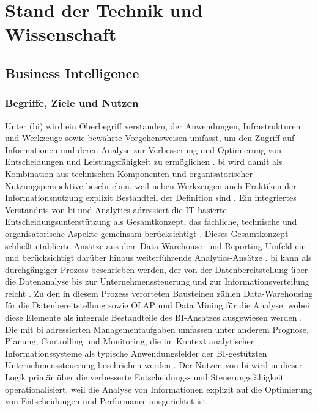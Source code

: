 
\chapter{Stand der Technik und Wissenschaft}\label{cap:wissensstand}


\section{Business Intelligence}\label{sec:bi} 

\subsection{Begriffe, Ziele und Nutzen}
Unter  (\gls{bi}) wird ein Oberbegriff verstanden, der Anwendungen, Infrastrukturen und Werkzeuge sowie bewährte Vorgehensweisen umfasst, um den Zugriff auf Informationen und deren Analyse zur Verbesserung und Optimierung von Entscheidungen und Leistungsfähigkeit zu ermöglichen \cite{GartnerABI}. \gls{bi} wird damit als Kombination aus technischen Komponenten und organisatorischer Nutzungsperspektive beschrieben, weil neben Werkzeugen auch Praktiken der Informationsnutzung explizit Bestandteil der Definition sind \cite{GartnerABI}. 
Ein integriertes Verständnis von \gls{bi} und Analytics adressiert die IT-basierte Entscheidungsunterstützung als Gesamtkonzept, das fachliche, technische und organisatorische Aspekte gemeinsam berücksichtigt \cite{BaarsKemperSpringerBook}. Dieses Gesamtkonzept schließt etablierte Ansätze aus dem Data-Warehouse- und Reporting-Umfeld ein und berücksichtigt darüber hinaus weiterführende Analytics-Ansätze \cite{BaarsKemperSpringerBook}. 
\gls{bi} kann als durchgängiger Prozess beschrieben werden, der von der Datenbereitstellung über die Datenanalyse bis zur Unternehmenssteuerung und zur Informationsverteilung reicht \cite{MuellerLenzMPDL}. Zu den in diesem Prozess verorteten Bausteinen zählen Data-Warehousing für die Datenbereitstellung sowie OLAP und Data Mining für die Analyse, wobei diese Elemente als integrale Bestandteile des BI-Ansatzes ausgewiesen werden \cite{MuellerLenzMPDL}. Die mit \gls{bi} adressierten Managementaufgaben umfassen unter anderem Prognose, Planung, Controlling und Monitoring, die im Kontext analytischer Informationssysteme als typische Anwendungsfelder der BI-gestützten Unternehmenssteuerung beschrieben werden \cite{MuellerLenzMPDL}. Der Nutzen von \gls{bi} wird in dieser Logik primär über die verbesserte Entscheidungs- und Steuerungsfähigkeit operationalisiert, weil die Analyse von Informationen explizit auf die Optimierung von Entscheidungen und Performance ausgerichtet ist \cite{GartnerABI}. 
